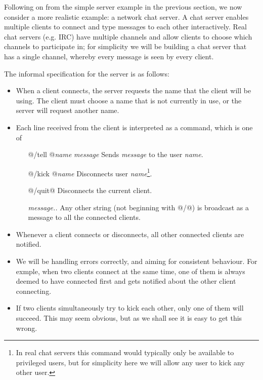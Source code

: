 
Following on from the simple server example in the previous section,
we now consider a more realistic example: a network chat server.  A
chat server enables multiple clients to connect and type messages to
each other interactively.  Real chat servers (e.g. IRC) have multiple
channels and allow clients to choose which channels to participate in;
for simplicity we will be building a chat server that has a single
channel, whereby every message is seen by every client.

The informal specification for the server is as follows:

\begin{itemize}
\item When a client connects, the server requests the name that the
  client will be using.  The client must choose a name that is not
  currently in use, or the server will request another name.

\item Each line received from the client is interpreted as a command,
  which is one of
  \begin{itemize}
    \item [@/tell @\textit{name} \textit{message}] Sends
      \textit{message} to the user \textit{name}.
    \item [@/kick @\textit{name}] Disconnects user
      \textit{name}\footnote{In real chat servers this command would
        typically only be available to privileged users, but for
        simplicity here we will allow any user to kick any other user.}.
    \item [@/quit@] Disconnects the current client.
    \item [\textit{message..}] Any other string (not beginning with
      @/@) is broadcast as a message to all the connected clients.
  \end{itemize}

\item Whenever a client connects or disconnects, all other connected
  clients are notified.

\item We will be handling errors correctly, and aiming for consistent
  behaviour.  For exmple, when two clients connect at the same time,
  one of them is always deemed to have connected first and gets
  notified about the other client connecting.

\item If two clients simultaneously try to kick each other, only one
  of them will succeed.  This may seem obvious, but as we shall see it
  is easy to get this wrong.

\end{itemize}

